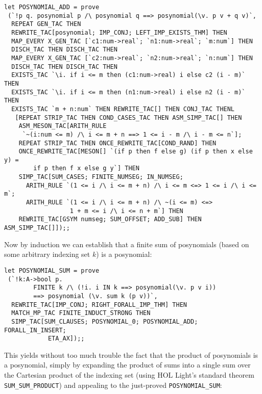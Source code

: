 \documentclass[10pt]{article}
\theoremstyle{definition}
\theoremstyle{remark}
\numberwithin{equation}{section}
\begin{document}
\begin{scriptsize}\begin{verbatim}
let POSYNOMIAL_ADD = prove
 (`!p q. posynomial p /\ posynomial q ==> posynomial(\v. p v + q v)`,
  REPEAT GEN_TAC THEN
  REWRITE_TAC[posynomial; IMP_CONJ; LEFT_IMP_EXISTS_THM] THEN
  MAP_EVERY X_GEN_TAC [`c1:num->real`; `n1:num->real`; `m:num`] THEN
  DISCH_TAC THEN DISCH_TAC THEN
  MAP_EVERY X_GEN_TAC [`c2:num->real`; `n2:num->real`; `n:num`] THEN
  DISCH_TAC THEN DISCH_TAC THEN
  EXISTS_TAC `\i. if i <= m then (c1:num->real) i else c2 (i - m)` THEN
  EXISTS_TAC `\i. if i <= m then (n1:num->real) i else n2 (i - m)` THEN
  EXISTS_TAC `m + n:num` THEN REWRITE_TAC[] THEN CONJ_TAC THENL
   [REPEAT STRIP_TAC THEN COND_CASES_TAC THEN ASM_SIMP_TAC[] THEN
    ASM_MESON_TAC[ARITH_RULE
     `~(i:num <= m) /\ i <= m + n ==> 1 <= i - m /\ i - m <= n`];
    REPEAT STRIP_TAC THEN ONCE_REWRITE_TAC[COND_RAND] THEN
    ONCE_REWRITE_TAC[MESON[] `(if p then f else g) (if p then x else y) =
        if p then f x else g y`] THEN
    SIMP_TAC[SUM_CASES; FINITE_NUMSEG; IN_NUMSEG;
      ARITH_RULE `(1 <= i /\ i <= m + n) /\ i <= m <=> 1 <= i /\ i <= m`;
      ARITH_RULE `(1 <= i /\ i <= m + n) /\ ~(i <= m) <=>
                  1 + m <= i /\ i <= n + m`] THEN
    REWRITE_TAC[GSYM numseg; SUM_OFFSET; ADD_SUB] THEN ASM_SIMP_TAC[]]);;
\end{verbatim}\end{scriptsize}

Now by induction we can establish that a finite sum of posynomials (based on
some arbitrary indexing set $k$) is a posynomial:

\begin{scriptsize}\begin{verbatim}
let POSYNOMIAL_SUM = prove
 (`!k:A->bool p.
        FINITE k /\ (!i. i IN k ==> posynomial(\v. p v i))
        ==> posynomial (\v. sum k (p v))`,
  REWRITE_TAC[IMP_CONJ; RIGHT_FORALL_IMP_THM] THEN
  MATCH_MP_TAC FINITE_INDUCT_STRONG THEN
  SIMP_TAC[SUM_CLAUSES; POSYNOMIAL_0; POSYNOMIAL_ADD; FORALL_IN_INSERT;
            ETA_AX]);;
\end{verbatim}\end{scriptsize}

This yields without too much trouble the fact that the product of posynomials
is a posynomial, simply by expanding the product of sums into a single sum over
the Cartesian product of the indexing set (using HOL Light's standard theorem
{\verb|SUM_SUM_PRODUCT|}) and appealing to the just-proved
{\verb|POSYNOMIAL_SUM|}:
\end{document}
